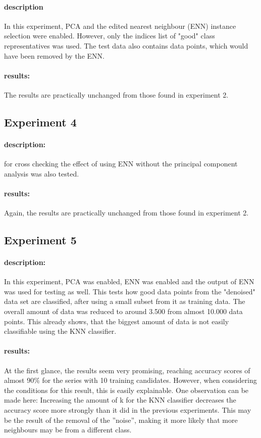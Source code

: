 \documentclass[10pt,a4paper]{proc}
\begin{document}
\paragraph{description}
In this experiment, PCA and the edited nearest neighbour (ENN) instance selection were enabled. However, only the indices list of "good" class representatives was used. The test data also contains data points, which would have been removed by the ENN.
\paragraph{results:} The results are practically unchanged from those found in experiment 2.

\FloatBarrier
\subsection{Experiment 4}\label{exp4}
\paragraph{description:} for cross checking the effect of using ENN without the principal component analysis was also tested.
\paragraph{results:} Again, the results are practically unchanged from those found in experiment 2.

\FloatBarrier
\subsection{Experiment 5}\label{exp5}
\paragraph{description:}
In this experiment, PCA was enabled, ENN was enabled and the output of ENN was used for testing as well. This tests how good data points from the "denoised" data set are classified, after using a small subset from it as training data. The overall amount of data was reduced to around 3.500 from almost 10.000 data points. This already shows, that the biggest amount of data is not easily classifiable using the KNN classifier.
\paragraph{results:}
At the first glance, the results seem very promising, reaching accuracy scores of almost 90\% for the series with 10 training candidates. However, when considering the conditions for this result, this is easily explainable. One observation can be made here: Increasing the amount of k for the KNN classifier decreases the accuracy score more strongly than it did in the previous experiments. This may be the result of the removal of the ''noise'', making it more likely that more neighbours may be from a different class.

\end{document}
